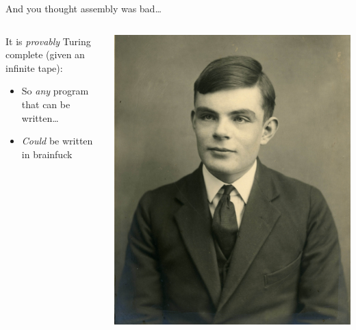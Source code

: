 \documentclass[9pt,aspectratio=169]{beamer}
\begin{document}
\begin{frame}[label={sec:org456b4b3},fragile]{And you thought assembly was bad\ldots{}}
\begin{columns}
\begin{column}[t]{0.79\columnwidth}
It is \emph{provably} Turing complete (given an infinite tape):
\begin{itemize}
\item So \emph{any} program that can be written\ldots{}
\item \emph{Could} be written in brainfuck
\end{itemize}
\end{column}
\begin{column}[t]{0.2\columnwidth}
\begin{center}
\includegraphics[width=\linewidth]{./turing.jpg}
\end{center}
\begin{center}

\end{center}
\end{column}
\end{columns}
\end{frame}
\end{document}
